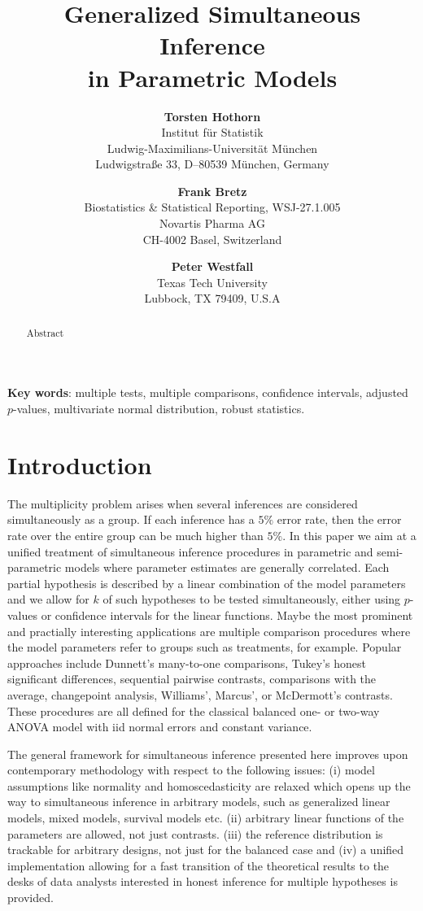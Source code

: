 \documentclass[12pt]{article}
\title{Generalized Simultaneous Inference \\ in Parametric Models}
\author{\textbf{Torsten Hothorn} \\
Institut f{\"u}r Statistik \\
Ludwig-Maximilians-Universit{\"a}t M{\"u}nchen \\
Ludwigstra{\ss}e 33, D--80539 M{\"u}nchen, Germany\\
\and \textbf{Frank Bretz} \\
Biostatistics \& Statistical Reporting, WSJ-27.1.005\\
Novartis Pharma AG \\
CH-4002 Basel, Switzerland \\
\and \textbf{Peter Westfall} \\
Texas Tech University \\
Lubbock, TX 79409, U.S.A}
\begin{document}
\maketitle
\thispagestyle{empty}
\setcounter{page}{0}

\begin{abstract}
Abstract
\end{abstract}

\textbf{Key words}: multiple tests, multiple comparisons, confidence intervals,
adjusted $p$-values, multivariate normal distribution, robust statistics.

\newpage

\section{Introduction}


The multiplicity problem arises when several inferences are considered
simultaneously as a group.  If each inference has a $5\%$ error rate,   
then the error rate over the entire group can be much higher than $5\%$.
In this paper we aim at a unified treatment of simultaneous
inference procedures in parametric and semi-parametric
models where parameter estimates are generally correlated.
Each partial hypothesis is described by a linear
combination of the model parameters and we allow
for $k$ of such hypotheses to be tested simultaneously,
either using $p$-values or confidence intervals
for the linear functions. Maybe the most prominent
and practially interesting applications are multiple
comparison procedures where the model parameters
refer to groups such as treatments, for example.
Popular approaches include Dunnett's many-to-one comparisons,
Tukey's honest significant differences, sequential pairwise contrasts, 
comparisons with the average, changepoint analysis, Williams', 
Marcus', or McDermott's contrasts. These procedures are
all defined for the classical balanced one- or two-way ANOVA model
with iid normal errors and constant variance.

The general framework for simultaneous inference presented here improves
upon contemporary methodology with respect to the following
issues: (i) model assumptions like normality and homoscedasticity
are relaxed which opens up the way to simultaneous inference
in arbitrary models, such as generalized linear models, mixed models,
survival models etc. (ii) arbitrary linear functions of the
parameters are allowed, not just contrasts. (iii) 
the reference distribution is trackable for arbitrary designs, not
just for the balanced case and (iv)
a unified implementation allowing for a fast transition of the
theoretical results to the desks of data analysts interested
in honest inference for multiple hypotheses is provided.
\end{document}
